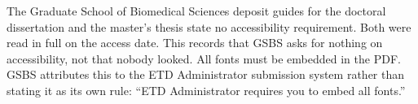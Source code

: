 %
	{The Graduate School of Biomedical Sciences deposit guides for the doctoral
	 dissertation and the master's thesis state no accessibility requirement.
	 Both were read in full on the access date. This records that GSBS asks for
	 nothing on accessibility, not that nobody looked.}
	{All fonts must be embedded in the PDF. GSBS attributes this to the ETD
	 Administrator submission system rather than stating it as its own rule:
	 ``ETD Administrator requires you to embed all fonts.''}

\newcommand{\ismms@ifdoctoral}[2]{%
	\def\ismms@tmp{dissertation}%
	\ifx\thesis@docnoun\ismms@tmp #1\else #2\fi
}

\newcommand{\ismms@dean}{}
\newcommand{\ismmsdean}[1]{\renewcommand{\ismms@dean}{#1}}

